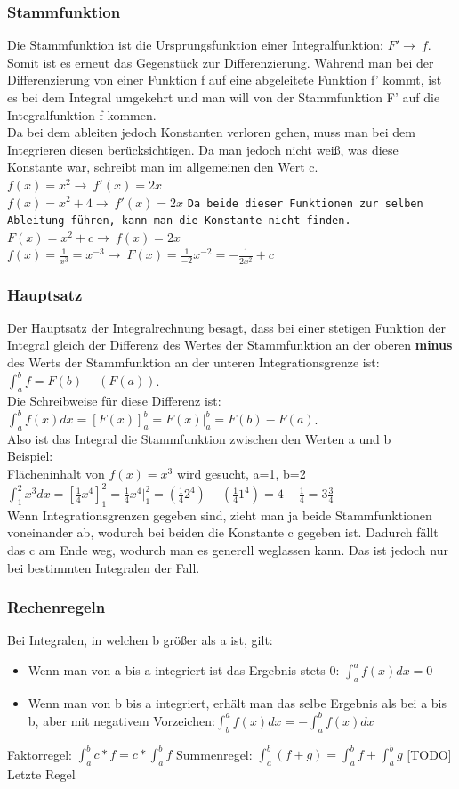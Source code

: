 \documentclass{article}
\begin{document}
	\subsubsection{Stammfunktion}
	Die Stammfunktion ist die Ursprungsfunktion einer Integralfunktion: $F'\to\ f$. Somit ist es erneut das Gegenstück zur Differenzierung. Während man bei der Differenzierung von einer Funktion f auf eine abgeleitete Funktion f' kommt, ist es bei dem Integral umgekehrt und man will von der Stammfunktion F' auf die Integralfunktion f kommen. \\
	Da bei dem ableiten jedoch Konstanten verloren gehen, muss man bei dem Integrieren diesen berücksichtigen. Da man jedoch nicht weiß, was diese Konstante war, schreibt man im allgemeinen den Wert c. \\
	$f(x)=x^2\to\ f'(x)=2x$ \\
	$f(x)=x^2+4\to\ f'(x)=2x$ \verb|Da beide dieser Funktionen zur selben Ableitung führen, kann man die Konstante nicht finden.|\\
	$F(x)=x^2+c\to\ f(x)=2x$ \\
	$f(x)=\frac{1}{x^3}=x^{-3}\to\ F(x)=\frac{1}{-2}x^{-2}=-\frac{1}{2x^2}+c$ \\
	\subsubsection{Hauptsatz}
	Der Hauptsatz der Integralrechnung besagt, dass bei einer stetigen Funktion der Integral gleich der Differenz des Wertes der Stammfunktion an der oberen \textbf{minus} des Werts der Stammfunktion an der unteren Integrationsgrenze ist: $\int_{a}^{b}f=F(b)-(F(a))$. \\
	Die Schreibweise für diese Differenz ist: $\int_{a}^{b}f(x)dx=[F(x)]^b_a=F(x)|^b_a=F(b)-F(a)$. \\
	Also ist das Integral die Stammfunktion zwischen den Werten a und b \\
	Beispiel: \\
	Flächeninhalt von $f(x)=x^3$ wird gesucht, a=1, b=2 \\
	$\int_{1}^{2}x^3dx=[\frac{1}{4}x^4]^2_1=\frac{1}{4}x^4|^2_1=(\frac{1}{4}2^4)-(\frac{1}{4}1^4)=4-\frac{1}{4}=3\frac{3}{4}$ \\
	Wenn Integrationsgrenzen gegeben sind, zieht man ja beide Stammfunktionen voneinander ab, wodurch bei beiden die Konstante c gegeben ist. Dadurch fällt das c am Ende weg, wodurch man es generell weglassen kann. Das ist jedoch nur bei bestimmten Integralen der Fall.
	\subsubsection{Rechenregeln}
	Bei Integralen, in welchen b größer als a ist, gilt:
	\begin{itemize}
		\item{Wenn man von a bis a integriert ist das Ergebnis stets 0: $\int_{a}^{a}f(x)dx=0$}
		\item{Wenn man von b bis a integriert, erhält man das selbe Ergebnis als bei a bis b, aber mit negativem Vorzeichen:$\int_{b}^{a}f(x)dx=-\int_{a}^{b}f(x)dx$}
	\end{itemize}
	Faktorregel:
	$\int_{a}^{b}c*f=c*\int_{a}^{b}f$
	Summenregel:
	$\int_{a}^{b}(f+g)=\int_{a}^{b}f+\int_{a}^{b}g$
	[TODO] Letzte Regel
\end{document}

